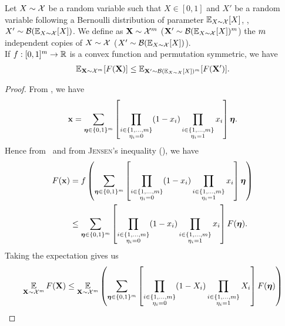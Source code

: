 \begin{noaddcontents}
\begin{lemma}
Let $X\sim\mathcal{X}$ be a random variable such that $X\in[0,1]$ and $X'$ be a random variable following a Bernoulli distribution of parameter $\operatorname*{\mathbb{E}}_{X\sim\mathcal{X}}[X]$, \ie, $X'\sim\mathcal{B}(\operatorname*{\mathbb{E}}_{X\sim\mathcal{X}}[X])$.
We define as $\mathbf{X}\sim\mathcal{X}^{m}$ (\resp $\mathbf{X}'\sim\mathcal{B}(\operatorname*{\mathbb{E}}_{X\sim\mathcal{X}}[X])^m$) the $m$ independent copies of $X\sim\mathcal{X}$ (\resp $X'\sim\mathcal{B}(\operatorname*{\mathbb{E}}_{X\sim\mathcal{X}}[X])$).\\
If $f: [0,1]^m\to \mathbb{R}$ is a convex function and permutation symmetric, we have
\begin{align*}
    {\textstyle\operatorname*{\ensuremath{\mathbb{E}}}_{\ensuremath{\mathbf{X}}\sim\ensuremath{\mathcal{X}}^m}}[F(\mathbf{X})] \le {\textstyle\operatorname*{\ensuremath{\mathbb{E}}}_{\ensuremath{\mathbf{X}}'\sim\ensuremath{\mathcal{B}}(\operatorname*{\ensuremath{\mathbb{E}}}_{X\sim\ensuremath{\mathcal{X}}}[X])^m}}[F(\mathbf{X}')].
\end{align*}
\label{ap:pac-bayes:lemma:real-binary}
\end{lemma}
\begin{proof}
From , we have 
\begin{align}
    \mathbf{x} = \sum_{\boldsymbol{\eta}\in\{0,1\}^m} \left[ \prod_{\substack{i\in\{1,\dots,m\}\\ \eta_i=0}}(1-x_i)\prod_{\substack{i\in\{1,\dots,m\}\\ \eta_i=1}}x_i\right]\boldsymbol{\eta}.\label{ap:pac-bayes:eq:proof-real-binary-1}
\end{align}
Hence from~ and from \textsc{Jensen}'s inequality (), we have 
\begin{align*}
    F(\mathbf{x}) &= f\left( \sum_{\boldsymbol{\eta}\in\{0,1\}^m} \left[ \prod_{\substack{i\in\{1,\dots,m\}\\ \eta_i=0}}(1-x_i)\prod_{\substack{i\in\{1,\dots,m\}\\ \eta_i=1}}x_i\right]\boldsymbol{\eta} \right)\\
    &\le \sum_{\boldsymbol{\eta} \in \{0,1\}^m} \left[ \prod_{\substack{i\in\{1,\dots,m\}\\ \eta_i=0}}(1-x_i)\prod_{\substack{i\in\{1,\dots,m\}\\ \eta_i=1}}x_i\right] F(\boldsymbol{\eta}).
\end{align*}
Taking the expectation gives us
\begingroup
\allowdisplaybreaks
\begin{align*}
    \EE_{\Xbf\sim\Xcal^\m}\catF(\Xbf) &\le \EE_{\Xbf\sim\Xcal^\m}\LP\sum_{\etabf \in \{0,1\}^\m} \LB \prod_{\substack{i\in\{1,\dots,\m\}\\ \eta_i=0}}(1-X_i)\prod_{\substack{i\in\{1,\dots,\m\}\\ \eta_i=1}}X_i\RB \catF(\etabf)\RP\\

\end{align*}
\end{proof}
\end{noaddcontents}
